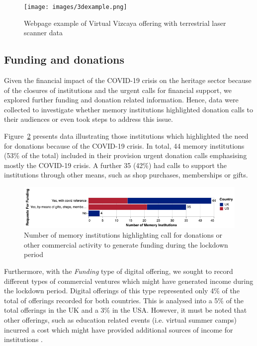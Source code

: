 \documentclass{egpubl}
\begin{document}
\begin{figure}[h]
  \centering
  \texttt{[image: images/3dexample.png]}
  \caption{\label{fig:3dexample}
  Webpage example of Virtual Vizcaya offering with terrestrial laser scanner data}
\end{figure}

\subsection{Funding and donations} 
\label{don}

Given the financial impact of the COVID-19 crisis on the heritage sector because of the closures of institutions and the urgent calls for financial support, we explored further funding and donation related information. Hence, data were collected to investigate whether memory institutions highlighted donation calls to their audiences or even took steps to address this issue.

Figure~\ref{fig:funding} presents data illustrating those institutions which highlighted the need for donations because of the COVID-19 crisis. In total, 44 memory institutions (53\% of the total) included in their provision urgent donation calls emphasising mostly the COVID-19 crisis. A further 35 (42\%) had calls to support the institutions through other means, such as shop purchases, memberships or gifts.

\begin{figure}[h]
  \centering
  \includegraphics[width=\linewidth]{images/funding.png}
  \caption{\label{fig:funding}
            Number of memory institutions highlighting call for donations or other commercial activity to generate funding during the lockdown period}
\end{figure}


Furthermore, with the \emph{Funding} type of digital offering, we sought to record different types of commercial ventures which might have generated income during the lockdown period. Digital offerings of this type represented only 4\% of the total of offerings recorded for both countries. This is analysed into a 5\% of the total offerings in the UK and a 3\% in the USA. However, it must be noted that other offerings, such as education related events (i.e. virtual summer camps) incurred a cost which might have provided additional sources of income for institutions \cite{Fieldmuseum,CaliforniaScienCenter2020}. 
 
\end{document}
